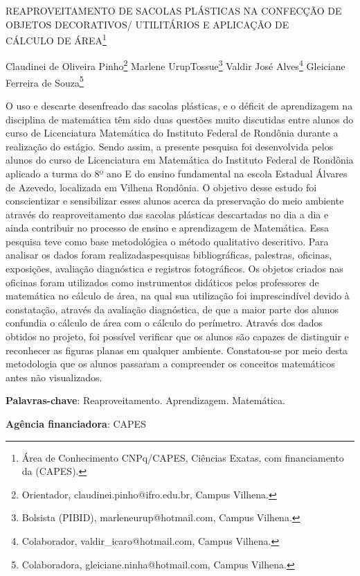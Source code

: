 \documentclass[article,12pt,onesidea,4paper,english,brazil]{abntex2}
\begin{document}
	
	
	\frenchspacing 
	
	\begin{center}
		\LARGE REAPROVEITAMENTO DE SACOLAS PLÁSTICAS NA CONFECÇÃO DE OBJETOS DECORATIVOS/ UTILITÁRIOS E APLICAÇÃO DE \\CÁLCULO DE ÁREA\footnote{Área de Conhecimento CNPq/CAPES, Ciências Exatas, com financiamento da (CAPES).}
		
		\normalsize
		Claudinei de Oliveira Pinho\footnote{Orientador, claudinei.pinho@ifro.edu.br, Campus Vilhena.} 
		Marlene UrupTossue\footnote{Bolsista (PIBID), marleneurup@hotmail.com, Campus Vilhena.} 
		Valdir José Alves\footnote{Colaborador, valdir\_icaro@hotmail.com, Campus Vilhena.} 
		Gleiciane Ferreira de Souza\footnote{Colaboradora, gleiciane.ninha@hotmail.com, Campus Vilhena.} 
	\end{center}
	
	\noindent O uso e descarte desenfreado das sacolas plásticas, e o déficit de aprendizagem na disciplina de matemática têm sido duas questões muito discutidas entre alunos do curso de Licenciatura Matemática do Instituto Federal de Rondônia durante a realização do estágio. Sendo assim, a presente pesquisa foi desenvolvida pelos alunos do curso de Licenciatura em Matemática do Instituto Federal de Rondônia aplicado a turma do 8º ano E do ensino fundamental na escola Estadual Álvares de Azevedo, localizada em Vilhena Rondônia. O objetivo desse estudo foi conscientizar e sensibilizar esses alunos acerca da preservação do meio ambiente através do reaproveitamento das sacolas plásticas descartadas no dia a dia e ainda contribuir no processo de ensino e aprendizagem de Matemática. Essa pesquisa teve como base metodológica o método qualitativo descritivo. Para analisar os dados foram realizadaspesquisas bibliográficas, palestras, oficinas, exposições, avaliação diagnóstica e registros fotográficos. Os objetos criados nas oficinas foram utilizados como instrumentos didáticos pelos professores de matemática no cálculo de área, na qual sua utilização foi imprescindível devido à constatação, através da avaliação diagnóstica, de que a maior parte dos alunos confundia o cálculo de área com o cálculo do perímetro. Através dos dados obtidos no projeto, foi possível verificar que os alunos são capazes de distinguir e reconhecer as figuras planas em qualquer ambiente. Constatou-se por meio desta metodologia que os alunos passaram a compreender os conceitos matemáticos antes não visualizados.
	
	\vspace{\onelineskip}
	
	\noindent
	\textbf{Palavras-chave}: Reaproveitamento. Aprendizagem. Matemática.
	
	\noindent
	\textbf{Agência financiadora}: CAPES
	
\end{document}
